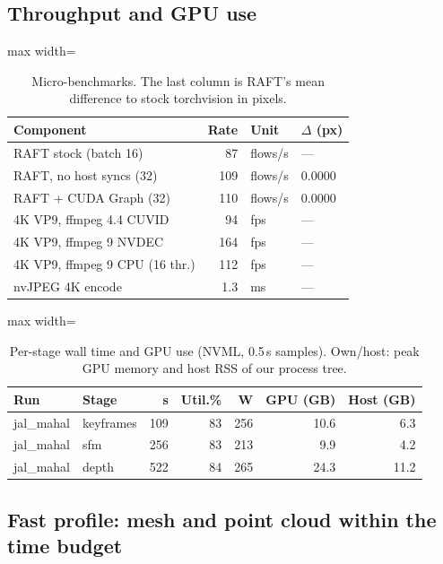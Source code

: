 \subsection{Throughput and GPU use}

\begin{table}[htbp]
\centering\small
\caption{Micro-benchmarks. The last column is RAFT's mean difference to stock torchvision in pixels.}\label{tab:bench}
\begin{adjustbox}{max width=\linewidth}
\begin{tabular}{lrll}
\toprule
Component & Rate & Unit & $\Delta$ (px) \\
\midrule
RAFT stock (batch 16) & 87 & flows/s & --- \\
RAFT, no host syncs (32) & 109 & flows/s & 0.0000 \\
RAFT + CUDA Graph (32) & 110 & flows/s & 0.0000 \\
4K VP9, ffmpeg 4.4 CUVID & 94 & fps & --- \\
4K VP9, ffmpeg 9 NVDEC & 164 & fps & --- \\
4K VP9, ffmpeg 9 CPU (16 thr.) & 112 & fps & --- \\
nvJPEG 4K encode & 1.3 & ms & --- \\
\bottomrule
\end{tabular}
\end{adjustbox}
\end{table}

\begin{table}[htbp]
\centering\small
\caption{Per-stage wall time and GPU use (NVML, 0.5\,s samples). Own/host: peak GPU memory and host RSS of our process tree.}\label{tab:gpu}
\begin{adjustbox}{max width=\linewidth}
\begin{tabular}{llrrrrr}
\toprule
Run & Stage & s & Util.\% & W & GPU (GB) & Host (GB) \\
\midrule
jal\_mahal & keyframes & 109 & 83 & 256 & 10.6 & 6.3 \\
jal\_mahal & sfm & 256 & 83 & 213 & 9.9 & 4.2 \\
jal\_mahal & depth & 522 & 84 & 265 & 24.3 & 11.2 \\
\bottomrule
\end{tabular}
\end{adjustbox}
\end{table}

\subsection{Fast profile: mesh and point cloud within the time budget}\label{sec:fast-results}

